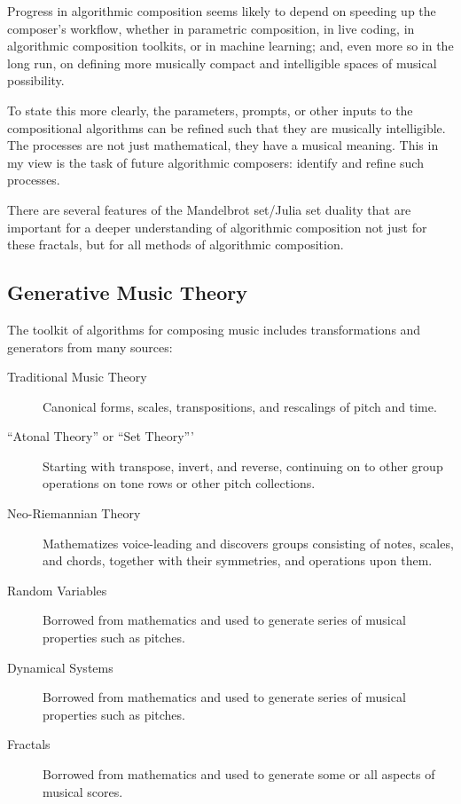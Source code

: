 \documentclass[11pt]{scrartcl}
\begin{document}
Progress in algorithmic composition seems likely to depend on speeding up the composer's workflow, whether in parametric composition, in live coding, in algorithmic composition toolkits, or in machine learning; and, even more so in the long run, on defining more musically compact and intelligible spaces of musical possibility.

To state this more clearly, the parameters, prompts, or other inputs to the compositional algorithms can be refined such that they are musically intelligible. The processes are not just mathematical, they have a musical meaning. This in my view is the task of future algorithmic composers: identify and refine such processes. 

There are several features of the Mandelbrot set/Julia set duality that are important for a deeper understanding of algorithmic composition not just for these fractals, but for all methods of algorithmic composition. 

\subsection*{Generative Music Theory}

The toolkit of algorithms for composing music includes transformations and generators from many sources:

\begin{description}
\item[Traditional Music Theory] Canonical forms, scales, transpositions, and rescalings of pitch and time.
\item[``Atonal Theory'' or ``Set Theory'''] Starting with transpose, invert, and reverse, continuing on to other group operations on tone rows or other pitch collections.
\item[Neo-Riemannian Theory] Mathematizes voice-leading and discovers groups consisting of notes, scales, and chords, together with their symmetries, and operations upon them.
\item[Random Variables] Borrowed from mathematics and used to generate series of musical properties such as pitches.
\item[Dynamical Systems] Borrowed from mathematics and used to generate series of musical properties such as pitches.
\item[Fractals] Borrowed from mathematics and used to generate some or all aspects of musical scores.
\end{description}
\end{document}
